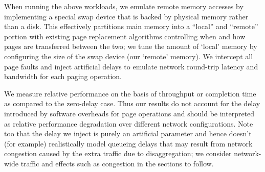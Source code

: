 When running the above workloads, we emulate remote memory accesses by implementing a special swap device that is backed by physical memory rather than a disk. This effectively partitions main memory into a ``local'' and ``remote'' portion 
with existing page replacement algorithms controlling when and how pages are transferred between the two; we tune the amount of `local' memory by configuring the size of the swap device (our `remote' memory).
We intercept all page faults and inject artificial delays to emulate network round-trip latency and bandwidth for each paging operation. 

We measure relative performance on the basis of throughput or completion time as compared to the zero-delay case. Thus our results do not account for the delay introduced by  software overheads for page operations 
and should be interpreted as relative performance degradation over different network configurations.%
Note too that the delay we inject is purely an artificial parameter and hence doesn't (for example) realistically model queueing delays that may result from network congestion caused by the extra traffic due to disaggregation; we consider network-wide traffic and effects such as congestion in the sections to follow.







